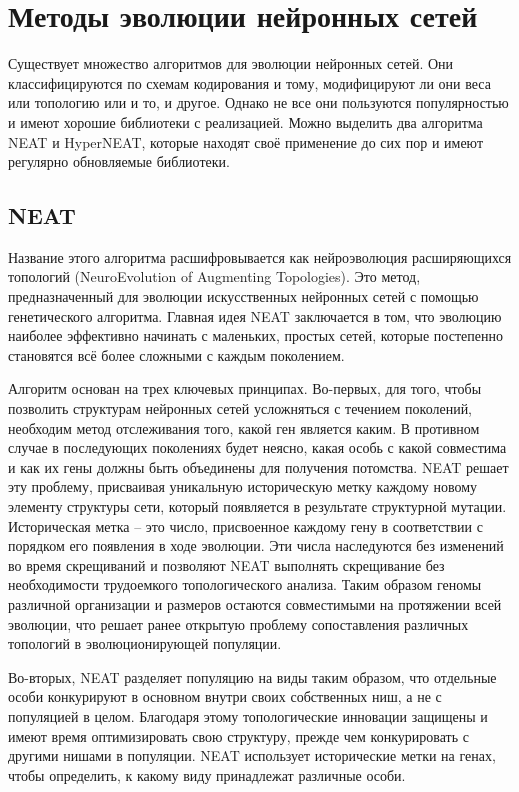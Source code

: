 ﻿%
\section{Методы эволюции нейронных сетей}\label{sec:evolutionMethods}

Существует множество алгоритмов для эволюции нейронных сетей. Они классифицируются по схемам кодирования и тому, модифицируют ли они веса или топологию или и то, и другое. Однако не все они пользуются популярностью и имеют хорошие библиотеки с реализацией. Можно выделить два алгоритма NEAT\cite{s1} и HyperNEAT\cite{s1}, которые находят своё применение до сих пор и имеют регулярно обновляемые библиотеки.

\subsection{NEAT}

Название этого алгоритма расшифровывается как нейроэволюция расширяющихся топологий (NeuroEvolution of Augmenting Topologies). Это метод, предназначенный для эволюции искусственных нейронных сетей с помощью генетического алгоритма. Главная идея NEAT заключается в том, что эволюцию наиболее эффективно начинать с маленьких, простых сетей, которые постепенно становятся всё более сложными с каждым поколением.

Алгоритм основан на трех ключевых принципах. Во-первых, для того, чтобы позволить структурам нейронных сетей усложняться с течением поколений, необходим метод отслеживания того, какой ген является каким. В противном случае в последующих поколениях будет неясно, какая особь с какой совместима и как их гены должны быть объединены для получения потомства. NEAT решает эту проблему, присваивая уникальную историческую метку каждому новому элементу структуры сети, который появляется в результате структурной мутации. Историческая метка – это число, присвоенное каждому гену в соответствии с порядком его появления в ходе эволюции. Эти числа наследуются без изменений во время скрещиваний и позволяют NEAT выполнять скрещивание без необходимости трудоемкого топологического анализа. Таким образом геномы различной организации и размеров остаются совместимыми на протяжении всей эволюции, что решает ранее открытую проблему сопоставления различных топологий в эволюционирующей популяции. 

Во-вторых, NEAT разделяет популяцию на виды таким образом, что отдельные особи конкурируют в основном внутри своих собственных ниш, а не с популяцией в целом. Благодаря этому топологические инновации защищены и имеют время оптимизировать свою структуру, прежде чем конкурировать с другими нишами в популяции. NEAT использует исторические метки на генах, чтобы определить, к какому виду принадлежат различные особи. 

